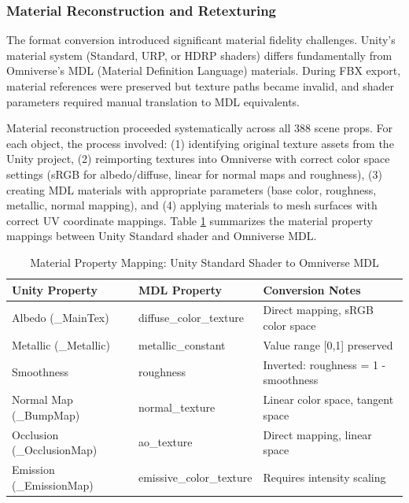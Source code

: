 \documentclass[12pt,a4paper]{article}
\begin{document}
\subsubsection{Material Reconstruction and Retexturing}

The format conversion introduced significant material fidelity challenges. Unity's material system (Standard, URP, or HDRP shaders) differs fundamentally from Omniverse's MDL (Material Definition Language) materials. During FBX export, material references were preserved but texture paths became invalid, and shader parameters required manual translation to MDL equivalents.

Material reconstruction proceeded systematically across all 388 scene props. For each object, the process involved: (1) identifying original texture assets from the Unity project, (2) reimporting textures into Omniverse with correct color space settings (sRGB for albedo/diffuse, linear for normal maps and roughness), (3) creating MDL materials with appropriate parameters (base color, roughness, metallic, normal mapping), and (4) applying materials to mesh surfaces with correct UV coordinate mappings. Table \ref{tab:material_conversion} summarizes the material property mappings between Unity Standard shader and Omniverse MDL.

\begin{table}[H]
\centering
\caption{Material Property Mapping: Unity Standard Shader to Omniverse MDL}
\label{tab:material_conversion}
\footnotesize
\begin{tabular}{p{4cm}|p{4cm}|p{5cm}}
\hline
\textbf{Unity Property} & \textbf{MDL Property} & \textbf{Conversion Notes} \\
\hline
\hline
Albedo (\_MainTex) & diffuse\_color\_texture & Direct mapping, sRGB color space \\
\hline
Metallic (\_Metallic) & metallic\_constant & Value range [0,1] preserved \\
\hline
Smoothness & roughness & Inverted: roughness = 1 - smoothness \\
\hline
Normal Map (\_BumpMap) & normal\_texture & Linear color space, tangent space \\
\hline
Occlusion (\_OcclusionMap) & ao\_texture & Direct mapping, linear space \\
\hline
Emission (\_EmissionMap) & emissive\_color\_texture & Requires intensity scaling \\
\hline
\end{tabular}
\end{table}
\end{document}
